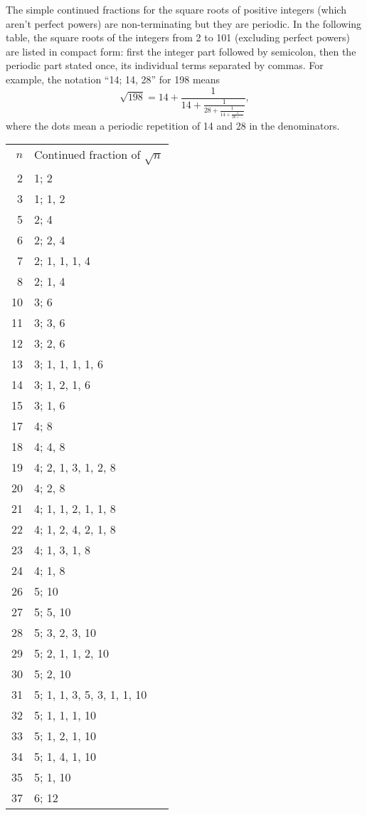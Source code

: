 \documentclass[12pt]{article}
\begin{document}
The simple continued fractions for the square roots of positive integers (which aren't perfect powers) are non-terminating but they are periodic. In the following table, the square roots of the integers from 2 to 101 (excluding perfect powers) are listed in compact form: first the integer part followed by semicolon, then the periodic part stated once, its individual terms separated by commas. For example, the notation ``14; 14, 28'' for 198 means $$\sqrt{198} = 14 + \frac{1}{14 + \frac{1}{28 + \frac{1}{14 + \frac{1}{28 + \ldots}}}},$$ where the dots mean a periodic repetition of 14 and 28 in the denominators.

\begin{tabular}{|r|l|}
$n$ & Continued fraction of $\sqrt{n}$ \\
2 & 1; 2 \\
3 & 1; 1, 2 \\
5 & 2; 4 \\
6 & 2; 2, 4 \\
7 & 2; 1, 1, 1, 4 \\
8 & 2; 1, 4 \\
10 & 3; 6 \\
11 & 3; 3, 6 \\
12 & 3; 2, 6 \\
13 & 3; 1, 1, 1, 1, 6 \\
14 & 3; 1, 2, 1, 6 \\
15 & 3; 1, 6 \\
17 & 4; 8 \\
18 & 4; 4, 8 \\
19 & 4; 2, 1, 3, 1, 2, 8 \\
20 & 4; 2, 8 \\
21 & 4; 1, 1, 2, 1, 1, 8 \\
22 & 4; 1, 2, 4, 2, 1, 8 \\
23 & 4; 1, 3, 1, 8 \\
24 & 4; 1, 8 \\
26 & 5; 10 \\
27 & 5; 5, 10 \\
28 & 5; 3, 2, 3, 10 \\
29 & 5; 2, 1, 1, 2, 10 \\
30 & 5; 2, 10 \\
31 & 5; 1, 1, 3, 5, 3, 1, 1, 10 \\
32 & 5; 1, 1, 1, 10 \\
33 & 5; 1, 2, 1, 10 \\
34 & 5; 1, 4, 1, 10 \\
35 & 5; 1, 10 \\
37 & 6; 12 \\

\end{tabular}
\end{document}
